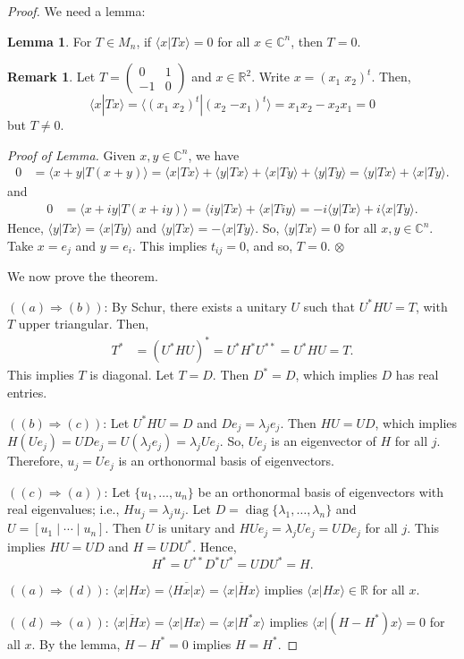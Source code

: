 \documentclass[12pt]{article}
\theoremstyle{definition}
\newtheorem*{lemma}{Lemma}
\newtheorem*{remark}{Remark}
\newcommand{\braket}[2]{\langle #1|#2\rangle}
\DeclareMathOperator{\diag}{diag}
\newcommand{\C}{\mathbb{C}}
\newcommand{\R}{\mathbb{R}}
\begin{document}
\begin{proof}
We need a lemma:

\begin{lemma}
For $T \in M_n$, if $\braket{x}{Tx} = 0$ for all $x \in \C^n$, then $T = 0$.
\end{lemma}

\begin{remark}
Let $T = \begin{pmatrix} 0 & 1 \\ -1 & 0 \end{pmatrix}$ and $x \in \R^2$. Write $x = (x_1\;x_2)^t$. Then,
\[
\braket{x}{Tx} = \braket{(x_1\;x_2)^t}{(x_2\;{-x_1})^t} = x_1 x_2 - x_2 x_1 = 0
\]
but $T \neq 0$.
\end{remark}

\textit{Proof of Lemma.} Given $x, y \in \C^n$, we have
\begin{align*}
0 &= \braket{x+y}{T(x+y)} = \braket{x}{Tx} + \braket{y}{Tx} + \braket{x}{Ty} + \braket{y}{Ty} = \braket{y}{Tx} + \braket{x}{Ty}.
\end{align*}
and
\begin{align*}
0 &= \braket{x+iy}{T(x+iy)} = \braket{iy}{Tx} + \braket{x}{Tiy} = -i\braket{y}{Tx} + i\braket{x}{Ty}.
\end{align*}
Hence, $\braket{y}{Tx} = \braket{x}{Ty}$ and $\braket{y}{Tx} = -\braket{x}{Ty}$. So, $\braket{y}{Tx} = 0$ for all $x, y \in \C^n$. Take $x = e_j$ and $y = e_i$. This implies $t_{ij} = 0$, and so, $T = 0$. $\otimes$

We now prove the theorem.

$((a) \Rightarrow (b))$: By Schur, there exists a unitary $U$ such that $U^*HU = T$, with $T$ upper triangular. Then,
\begin{align*}
T^* &= (U^*HU)^* = U^* H^* U^{**} = U^*HU = T.
\end{align*}
This implies $T$ is diagonal. Let $T = D$. Then $D^* = D$, which implies $D$ has real entries.

$((b) \Rightarrow (c))$: Let $U^*HU = D$ and $De_j = \lambda_j e_j$. Then $HU = UD$, which implies $H(Ue_j) = UDe_j = U(\lambda_j e_j) = \lambda_j Ue_j$. So, $Ue_j$ is an eigenvector of $H$ for all $j$. Therefore, $u_j = Ue_j$ is an orthonormal basis of eigenvectors.

$((c) \Rightarrow (a))$: Let $\{u_1,\ldots,u_n\}$ be an orthonormal basis of eigenvectors with real eigenvalues; i.e., $Hu_j = \lambda_j u_j$. Let $D = \diag\{\lambda_1,\ldots,\lambda_n\}$ and $U = [u_1 \mid \cdots \mid u_n]$. Then $U$ is unitary and $HUe_j = \lambda_j Ue_j = UDe_j$ for all $j$. This implies $HU = UD$ and $H = UDU^*$. Hence,
\[
H^* = U^{**} D^* U^* = UDU^* = H.
\]

$((a) \Rightarrow (d))$: $\braket{x}{Hx} = \overline{\braket{Hx}{x}} = \overline{\braket{x}{Hx}}$ implies $\braket{x}{Hx} \in \R$ for all $x$.

$((d) \Rightarrow (a))$: $\overline{\braket{x}{Hx}} = \braket{x}{Hx} = \braket{x}{H^*x}$ implies $\braket{x}{(H-H^*)x} = 0$ for all $x$. By the lemma, $H - H^* = 0$ implies $H = H^*$.
\end{proof}
\end{document}
